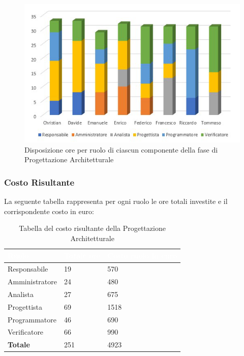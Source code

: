 \begin{figure}[h!]
	\centering
	
	\includegraphics[scale=3]{Sezioni/Istogrammi/IstogrammaProgettArchitetturale.png}
	\caption{Disposizione ore per ruolo di ciascun componente della fase di Progettazione Architetturale}
\end{figure}


\subsubsection{Costo Risultante}
La seguente tabella rappresenta per ogni ruolo le ore totali investite e il corrispondente costo in euro:
{
\renewcommand{\arraystretch}{2}
\centering

\begin{longtable}{ C{3cm} C{2cm} C{4cm}}
\caption{Tabella del costo risultante della Progettazione Architetturale}\\
	\textcolor{white}{\textbf{Ruolo}} & 
	\textcolor{white}{\textbf{Totale ore}} & 
	\textcolor{white}{\textbf{Costo ruolo in euro}}\\	
\endhead
        
        Responsabile & 19 & 570 \\
        Amministratore & 24 & 480 \\
        Analista & 27 & 675 \\
        Progettista & 69 & 1518 \\
        Programmatore & 46 & 690 \\
        Verificatore & 66 & 990 \\
        \textbf{Totale} & 251 & 4923 \\	
        	
	\end{longtable}

}


